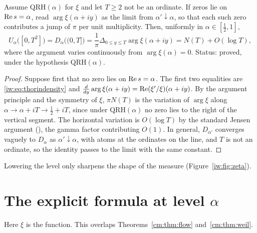 \begin{theorem}\label{iw:thm:mass}
Assume $\mathrm{QRH}(\alpha)$ for $\xi$ and let $T\ge2$ not be an ordinate. If zeros lie on $\operatorname{Re} s=\alpha$, read $\arg\xi(\alpha+iy)$ as the limit from $\alpha'\downarrow\alpha$, so that each such zero contributes a jump of $\pi$ per unit multiplicity. Then, uniformly in $\alpha\in[\frac12,1]$,
\[
U_\alpha\big([0,T^2]\big)=D_\alpha\big((0,T]\big)=\frac1\pi\Delta_{0\le y\le T}\arg\xi(\alpha+iy)=N(T)+O(\log T),
\]
where the argument varies continuously from $\arg\xi(\alpha)=0$. Status: proved, under the hypothesis $\mathrm{QRH}(\alpha)$.
\end{theorem}

\begin{proof}
Suppose first that no zero lies on $\operatorname{Re} s=\alpha$. The first two equalities are \eqref{iw:eq:thorindensity} and $\frac d{dy}\arg\xi(\alpha+iy)=\operatorname{Re}(\xi'/\xi)(\alpha+iy)$. By the argument principle and the symmetry of $\xi$, $\pi N(T)$ is the variation of $\arg\xi$ along $\alpha\to\alpha+iT\to\frac12+iT$, since under $\mathrm{QRH}(\alpha)$ no zero lies to the right of the vertical segment. The horizontal variation is $O(\log T)$ by the standard Jensen argument (\cite[\S9.4]{Titchmarsh}), the gamma factor contributing $O(1)$. In general, $D_{\alpha'}$ converges vaguely to $D_\alpha$ as $\alpha'\downarrow\alpha$, with atoms at the ordinates on the line, and $T$ is not an ordinate, so the identity passes to the limit with the same constant.
\end{proof}

Lowering the level only sharpens the shape of the measure (Figure~\ref{iw:fig:zeta}).

\section{The explicit formula at level \texorpdfstring{$\alpha$}{alpha}}\label{iw:sec:weil}

Here $\xi$ is the function. This overlaps Theorems~\ref{cm:thm:flow} and~\ref{cm:thm:weil}.

